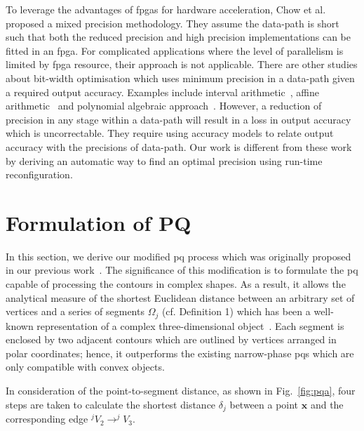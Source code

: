 To leverage the advantages of \gls{fpga}s for hardware acceleration, Chow et al.~\cite{chow11} proposed a mixed precision methodology.
They assume the data-path is short such that both the reduced precision and high precision implementations can be fitted in an \gls{fpga}.
For complicated applications where the level of parallelism is limited by \gls{fpga} resource, their approach is not applicable.
There are other studies about bit-width optimisation which uses minimum precision in a data-path given a required output accuracy.
Examples include interval arithmetic~\cite{fang03}, affine arithmetic~\cite{lee05,osborne07} and polynomial algebraic approach~\cite{boland10}.
However, a reduction of precision in any stage within a data-path will result in a loss in output accuracy which is uncorrectable.
They require using accuracy models to relate output accuracy with the precisions of data-path.
Our work is different from these work by deriving an automatic way to find an optimal precision using run-time reconfiguration.

\section{Formulation of PQ}
\label{sec:formulation}

In this section, we derive our modified \gls{pq} process which was originally proposed in our previous work~\cite{kwok13}. 
The significance of this modification is to formulate the \gls{pq} capable of processing the contours in complex shapes. 
As a result, it allows the analytical measure of the shortest Euclidean distance between an arbitrary set of vertices and a series of segments $\Omega_j$ (cf. Definition 1) which has been a well-known representation of a complex three-dimensional object~\cite{ponce89}. 
Each segment is enclosed by two adjacent contours which are outlined by vertices arranged in polar coordinates; 
hence, it outperforms the existing narrow-phase \gls{pq}s which are only compatible with convex objects. 

In consideration of the point-to-segment distance, as shown in Fig.~\ref{fig:pqa}, four steps are taken to calculate the shortest distance $\delta_j$ between a point $\boldsymbol{x}$ and the corresponding edge $^jV_2 \rightarrow ^jV_3$.

